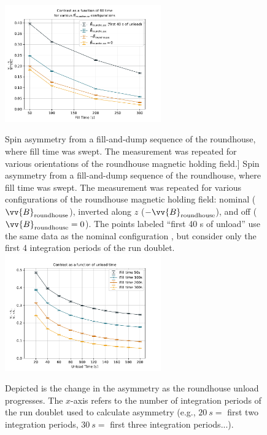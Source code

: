  \begin{figure}
    \centering
    \includegraphics[width=0.6\textwidth]{figures/2021_roundhouse_asymmetry_1.pdf}
    \caption
    [Spin asymmetry from a fill-and-dump sequence of the roundhouse, where fill time was swept. The measurement was repeated for various orientations of the roundhouse magnetic holding field.]
    {Spin asymmetry from a fill-and-dump sequence of the roundhouse, where fill time was swept. The measurement was repeated for various configurations of the roundhouse magnetic holding field: nominal ($\vv{B}_\text{roundhouse}$), inverted along $z$ ($-\vv{B}_\text{roundhouse}$), and off ($\vv{B}_\text{roundhouse}=0$). The  points labeled ``first 40 s of unload'' use the same data as the nominal configuration , but consider only the first 4 integration periods of the run doublet.}
    \label{fig:2021_roundhouse_asymmetry_1}
    \vspace{\baselineskip}
    \centering
    \includegraphics[width=0.6\textwidth]{figures/2021_roundhouse_asymmetry_2.pdf}
    \caption[Depicted is the change in the asymmetry as the roundhouse unload progresses. The $x$-axis refers to the number of integration periods of the run doublet used to calculate asymmetry]
    {Depicted is the change in the asymmetry as the roundhouse unload progresses. The $x$-axis refers to the number of integration periods of the run doublet used to calculate asymmetry (e.g., $\qty{20}{s}=$ first two integration periods,  $\qty{30}{s}=$ first three integration periods...).}\label{fig:2021_roundhouse_asymmetry_2}
\end{figure}